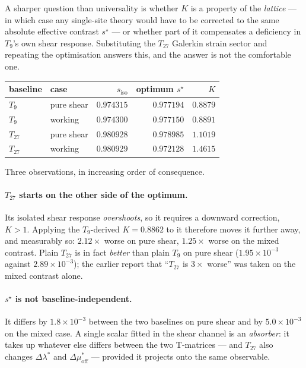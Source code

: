 \documentclass[11pt,a4paper]{article}
\newcommand{\Dmu}{\Delta\mu}
\newcommand{\Dlam}{\Delta\lambda}
\newcommand{\Kren}{K}
\begin{document}
A sharper question than universality is whether $\Kren$ is a property of the
\emph{lattice} --- in which case any single-site theory would have to be
corrected to the same absolute effective contrast $s^\star$ --- or whether part of
it compensates a deficiency in $T_9$'s own shear response. Substituting the
$T_{27}$ Galerkin strain sector and repeating the optimisation answers this, and
the answer is not the comfortable one.

\begin{center}
\begin{tabular}{llrrr}
\toprule
baseline & case & $s_{\text{iso}}$ & optimum $s^\star$ & $\Kren$ \\
\midrule
$T_9$   & pure shear & $0.974315$ & $0.977194$ & $0.8879$ \\
$T_9$   & working    & $0.974300$ & $0.977150$ & $0.8891$ \\
$T_{27}$ & pure shear & $0.980928$ & $0.978985$ & $1.1019$ \\
$T_{27}$ & working    & $0.980929$ & $0.972128$ & $1.4615$ \\
\bottomrule
\end{tabular}
\end{center}

Three observations, in increasing order of consequence.

\paragraph{$T_{27}$ starts on the other side of the optimum.} Its isolated shear
response \emph{overshoots}, so it requires a downward correction, $\Kren>1$.
Applying the $T_9$-derived $\Kren=0.8862$ to it therefore moves it further away,
and measurably so: $2.12\times$ worse on pure shear, $1.25\times$ worse on the
mixed contrast. Plain $T_{27}$ is in fact \emph{better} than plain $T_9$ on pure
shear ($1.95\times10^{-3}$ against $2.89\times10^{-3}$); the earlier report that
``$T_{27}$ is $3\times$ worse'' was taken on the mixed contrast alone.

\paragraph{$s^\star$ is not baseline-independent.} It differs by
$1.8\times10^{-3}$ between the two baselines on pure shear and by
$5.0\times10^{-3}$ on the mixed case. A single scalar fitted in the shear channel
is an \emph{absorber}: it takes up whatever else differs between the two
T-matrices --- and $T_{27}$ also changes $\Dlam^*$ and $\Dmu^*_{\text{off}}$ ---
provided it projects onto the same observable.
\end{document}
